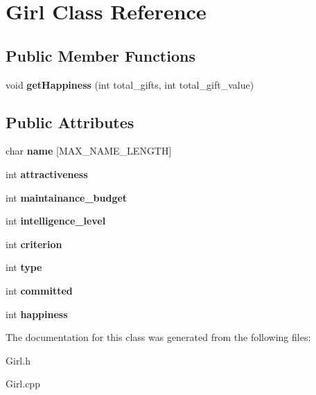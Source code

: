 \hypertarget{class_girl}{}\section{Girl Class Reference}
\label{class_girl}
\subsection*{Public Member Functions}
\begin{DoxyCompactItemize}
\item 
\mbox{\label{class_girl_a8844d2de1392d0cdcc5e201bc319a026}} 
void {\bfseries get\+Happiness} (int total\+\_\+gifts, int total\+\_\+gift\+\_\+value)
\end{DoxyCompactItemize}
\subsection*{Public Attributes}
\begin{DoxyCompactItemize}
\item 
\mbox{\label{class_girl_a2004677d7018a6564637f77e943e18ed}} 
char {\bfseries name} \mbox{[}M\+A\+X\+\_\+\+N\+A\+M\+E\+\_\+\+L\+E\+N\+G\+TH\mbox{]}
\item 
\mbox{\label{class_girl_ab97bd68f8bc0ab5ee3fb9d2784ed1474}} 
int {\bfseries attractiveness}
\item 
\mbox{\label{class_girl_a26a1e9bb93af4617482020c94fa7228c}} 
int {\bfseries maintainance\+\_\+budget}
\item 
\mbox{\label{class_girl_a5c6c20728355a49c2776f291b95e8253}} 
int {\bfseries intelligence\+\_\+level}
\item 
\mbox{\label{class_girl_a1a2a395adc6fdf036a4487892ea4cebb}} 
int {\bfseries criterion}
\item 
\mbox{\label{class_girl_ac0242bb0ae7c23f69a75537437f76586}} 
int {\bfseries type}
\item 
\mbox{\label{class_girl_ac5829e7ec762f1a3fb7484acfd6c1680}} 
int {\bfseries committed}
\item 
\mbox{\label{class_girl_a50337447735a8f518fd817338d04d5b9}} 
int {\bfseries happiness}
\end{DoxyCompactItemize}


The documentation for this class was generated from the following files\+:\begin{DoxyCompactItemize}
\item 
Girl.\+h\item 
Girl.\+cpp\end{DoxyCompactItemize}
